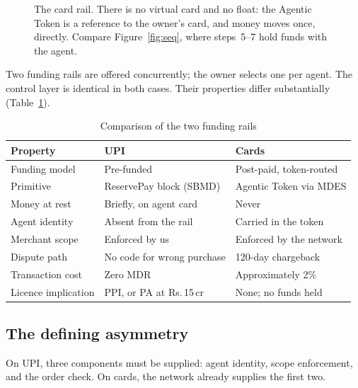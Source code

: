 \documentclass[journal,onecolumn,11pt]{IEEEtran}
\newcommand{\rs}{Rs.\,}
\begin{document}
\begin{figure}[t]
{}
\caption{The card rail. There is no virtual card and no float: the Agentic Token is a
reference to the owner's card, and money moves once, directly. Compare
Figure~\ref{fig:seq}, where steps~5--7 hold funds with the agent.}
\label{fig:seqcard}
\end{figure}

Two funding rails are offered concurrently; the owner selects one per agent. The
control layer is identical in both cases. Their properties differ substantially
(Table~\ref{tab:rails}).

\begin{table}[t]
\centering
\caption{Comparison of the two funding rails}
\label{tab:rails}
\begin{tabular}{@{}lll@{}}
\toprule
\textbf{Property} & \textbf{UPI} & \textbf{Cards} \\
\midrule
Funding model      & Pre-funded              & Post-paid, token-routed \\
Primitive          & ReservePay block (SBMD) & Agentic Token via MDES \\
Money at rest      & Briefly, on agent card  & Never \\
Agent identity     & Absent from the rail    & Carried in the token \\
Merchant scope     & Enforced by us          & Enforced by the network \\
Dispute path       & No code for wrong purchase & 120-day chargeback \\
Transaction cost   & Zero MDR                & Approximately 2\% \\
Licence implication & PPI, or PA at \rs 15\,cr & None; no funds held \\
\bottomrule
\end{tabular}
\end{table}

\subsection{The defining asymmetry}
On UPI, three components must be supplied: agent identity, scope enforcement, and the
order check. On cards, the network already supplies the first two.
\end{document}
